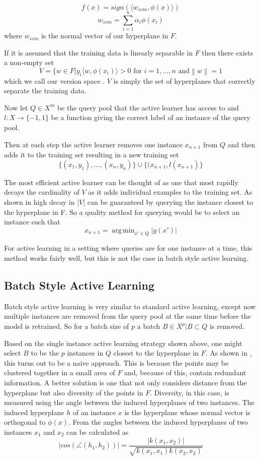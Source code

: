 \documentclass{article}
\newcommand\norm[1]{\left\lVert#1\right\rVert}
\DeclareMathOperator*{\argmin}{arg\,min}
\begin{document}
\[
f(x) = sign(\langle w_{svm}, \phi(x) \rangle)
\]
\[
w_{svm} = \sum_{i=1}^n \alpha_i \phi(x_i)
\]
where $w_{svm}$ is the normal vector of our hyperplane in $F$. 

If it is assumed that the training data is linearly separable in $F$ then there exists a non-empty set
\[
V = \{w \in F | y_i \langle w, \phi(x_i) \rangle > 0 \text{ for } i = 1, ...,n \text{ and} \norm{w} = 1
\]
which we call our version space \cite{version_space}. $V$ is simply the set of hyperplanes that correctly separate the training data.

Now let $Q \in X^m$ be the query pool that the active learner has access to and
$l : X \rightarrow \{-1,1\}$ be a function giving the correct label of an instance of the query pool.

Then at each step the active learner removes one instance $x_{n+1}$ from $Q$ and then adds it to the training set resulting in a new training set
\[
\{(x_1, y_1),...,(x_n,y_n)\}\cup\{(x_{n+1}, l(x_{n+1})\}
\]


The most efficient active learner can be thought of as one that most rapidly decays the cardinality of $V$ as it adds individual examples to the training set. As shown in \cite{active_learning} high decay in $|V|$ can be guaranteed by querying the instance closest to the hyperplane in F. So a quality method for querying would be to select an instance such that
\[
x_{n+1} = \argmin_{x' \in Q} |g(x')|
\]

For active learning in a setting where queries are for one instance at a time, this method works fairly well, but this is not the case in batch style active learning. 

\subsection*{Batch Style Active Learning}

Batch style active learning is very similar to standard active learning, except now multiple instances are removed from the query pool at the same time before the model is retrained. So for a batch size of $p$ a batch
$B \in X^p | B \subset Q$ is removed.


Based on the single instance active learning strategy shown above, one might select $B$ to be the $p$ instances in $Q$ closest to the hyperplane in $F$. As shown in \cite{active_learning}, this turns out to be a naive approach. This is because the points may be clustered together in a small area of $F$ and, because of this, contain redundant information. A better solution is one that not only considers distance from the hyperplane but also diversity of the points in $F$. Diversity, in this case, is measured using the angle between the induced hyperplanes of two instances. The induced hyperplane $h$ of an instance $x$ is the hyperplane whose normal vector is orthogonal to $\phi(x)$. From \cite{active_learning} the angles between the induced hyperplanes of two instances $x_1$ and $x_2$ can be calculated as
\[
|cos(\angle(h_1, h_2))| = \frac{|k(x_1,x_2)|}{\sqrt{k(x_1,x_1)k(x_2, x_2)}}
\]
\end{document}
